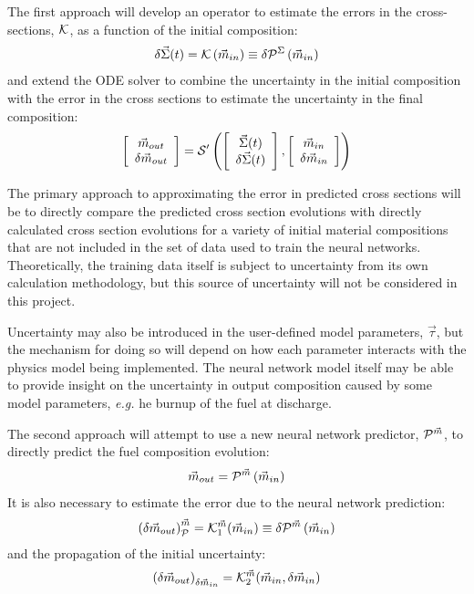 \documentclass[dvips,12pt]{article}
\newcommand{\unc}[1]
{ \delta #1 }
\newcommand{\uncvector}[1]
{ \left[ \begin{array}{c} #1 \\ \delta #1 \end{array} \right] }
\begin{document}
The first approach will develop an operator to
estimate the errors in the cross-sections, 
${\cal K}$, as a function of the initial composition:
\begin{align}
  \delta\vec{\Sigma}(t)  = {\cal K}\left( \vec{m}_{in}\right)  \equiv  \unc{{\cal P}^\Sigma\left( \vec{m}_{in}\right)} \label{eq:NNSigmaError}
\end{align}
and extend the ODE solver to combine the
uncertainty in the initial composition with the
error in the cross sections to estimate the
uncertainty in the final composition:
\begin{align}
  \uncvector{\vec{m}_{out}} = {\cal S^\prime}\left( \uncvector{\vec{\Sigma}(t)}, \uncvector{\vec{m}_{in}}\right)
\end{align}

The primary approach to approximating the error in
predicted cross sections will be to directly
compare the predicted cross section evolutions
with directly calculated cross section evolutions
for a variety of initial material compositions that
are not included in the set of data used to train
the neural networks.  Theoretically, the training
data itself is subject to uncertainty from its own
calculation methodology, but this source of
uncertainty will not be considered in this
project.

Uncertainty may also be introduced in the
user-defined model parameters, $\vec{\tau}$, but the
mechanism for doing so will depend on how each
parameter interacts with the physics model being
implemented.  The neural network model itself may
be able to provide insight on the uncertainty in
output composition caused by some model
parameters, \textit{e.g.} he burnup of the fuel at
discharge.

The second approach will attempt to use a new
neural network predictor, ${\cal P}^{\vec{m}}$, to
directly predict the fuel composition evolution:
\begin{align} \vec{m}_{out} = {\cal P}^{\vec{m}}\left( \vec{m}_{in}\right)
\end{align}
It is also necessary to estimate the error due to
the neural network prediction:
\begin{align}
  \left(\unc{\vec{m}_{out}}\right)_{\cal P}^{\vec{m}}= {\cal K}_1^{{\vec{m}}}(\vec{m}_{in})  \equiv \unc{{\cal P}^{\vec{m}}\left( \vec{m}_{in}\right)} \label{eq:NNModError}
\end{align}
and the propagation of the initial uncertainty:
\begin{align}
  \left(\unc{\vec{m}_{out}}\right)_{\unc{\vec{m}_{in}}} = {\cal K}^{{\vec{m}}}_2(\vec{m}_{in}, \unc{\vec{m}_{in}})
\end{align}
\end{document}
